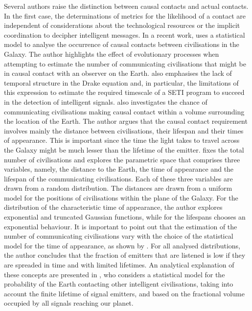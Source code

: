\documentclass[crop]{CSLB}
\begin{document}
Several authors raise the distinction between causal contacts and
actual contacts.
%
In the first case, the determinations of metrics for the likelihood of
a contact are independent of considerations about the technological
resources or the implicit coordination to decipher intelligent
messages.
%
In a recent work, \citet{balbi_impact_2018} uses a statistical model
to analyse the occurrence of causal contacts between civilisations in
the Galaxy.
%
The author highlights the effect of evolutionary processes when
attempting to estimate the number of communicating civilisations that
might be in causal contact with an observer on the Earth.
%
\citet{cirkovic_temporal_2004} also emphasises the lack of temporal
structure in the Drake equation and, in particular, the limitations of
this expression to estimate the required timescale of a SETI program
to succeed in the detection of intelligent signals.
% 
\citet{balbi_impact_2018} also investigates the chance of
communicating civilisations making causal contact within a volume
surrounding the location of the Earth.
%
The author argues that the causal contact requirement involves mainly
the distance between civilisations, their lifespan and their times of
appearance.
%
This is important since the time the light takes to travel across the
Galaxy might be much lesser than the lifetime of the emitter.
%
\citet{balbi_impact_2018} fixes the total number of civilisations and
explores the parametric space that comprises three variables, namely,
the distance to the Earth, the time of appearance and the lifespan of
the communicating civilisations.
%
Each of these three variables are drawn from a random distribution.
%
The distances are drawn from a uniform model for the positions of
civilisations within the plane of the Galaxy.
%
For the distribution of the characteristic time of appearance, the
author explores exponential and truncated Gaussian functions, while
for the lifespans chooses an exponential behaviour.
%
It is important to point out that the estimation of the number of
communicating civilisations vary with the choice of the statistical
model for the time of appearance, as shown by
\citet{balbi_impact_2018}.
%
For all analysed distributions, the author concludes that the fraction
of emitters that are listened is low if they are spreaded in time and
with limited lifetimes.
%
An analytical explanation of these concepts are presented in
\citet{grimaldi_signal_2017}, who considers a statistical model for
the probability of the Earth contacting other intelligent
civilisations, taking into account the finite lifetime of signal
emitters, and based on the fractional volume occupied by all signals
reaching our planet.
\end{document}

